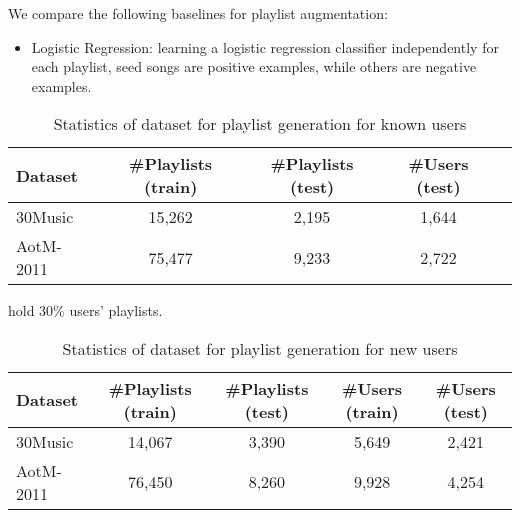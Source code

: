 We compare the following baselines for playlist augmentation:
\begin{itemize}
\item Logistic Regression: learning a logistic regression classifier independently for each playlist,
      seed songs are positive examples, while others are negative examples.
\end{itemize}


\begin{table}[!h]
\centering
\caption{Statistics of dataset for playlist generation for known users}
\label{tab:stats_cold}
\begin{tabular}{lcccc}
\toprule
Dataset   & \#Playlists (train) & \#Playlists (test) & \#Users (test) \\
\midrule
30Music   & 15,262 & 2,195 & 1,644 \\
AotM-2011 & 75,477 & 9,233 & 2,722 \\
\bottomrule
\end{tabular}
\end{table}

hold 30\% users' playlists.
\begin{table}[!h]
\centering
\caption{Statistics of dataset for playlist generation for new users}
\label{tab:stats_cold}
\begin{tabular}{lcccc}
\toprule
Dataset   & \#Playlists (train) & \#Playlists (test) & \#Users (train) & \#Users (test) \\
\midrule
30Music   & 14,067 & 3,390 & 5,649 & 2,421 \\
AotM-2011 & 76,450 & 8,260 & 9,928 & 4,254 \\       
\bottomrule
\end{tabular}
\end{table}


